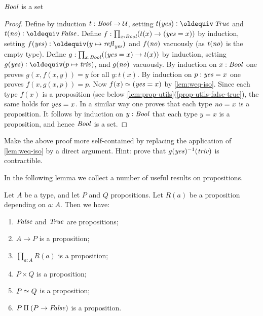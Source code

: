\begin{lemma}\label{lem:isset-bool}
$\mathop{\mathit{Bool}}$ is a set
\end{lemma}
\begin{proof}
Define by induction $t:\mathop{\mathit{Bool}}\to\mathcal{U}$, setting $t(\yes)\defeq \true$ and
$t(\no)\defeq \false$. Define $f:\prod_{x:\mathop{\mathit{Bool}}}(t(x)\to (\mathop{\mathit{yes}}=x))$ by
induction, setting $f(\yes)\defeq (y\mapsto \refl{\yes})$ and 
$f(\mathop{\mathit{no}})$ vacuously (as $t(\mathop{\mathit{no}})$ is the empty type). 
Define $g:\prod_{x:\mathop{\mathit{Bool}}}((\mathop{\mathit{yes}}=x)\to t(x))$ by induction, 
setting $g(\yes)\defeq (p\mapsto \triv)$, and $g(\mathop{\mathit{no}})$ vacuously. 
By induction on $x:\mathop{\mathit{Bool}}$ one proves $g(x,f(x,y))=y$ for all $y:t(x)$. 
By induction on $p: \mathop{\mathit{yes}} = x$ one proves $f(x,g(x,p))=p$.
Now $f(x)\simeq (\mathop{\mathit{yes}}=x)$ by \cref{lem:weq-iso}.  
Since each type $f(x)$ is a proposition (see below
\cref{lem:prop-utils}(\ref{prop-utils-false-true}), the same holds
for $\mathop{\mathit{yes}} = x$. In a similar way one proves that each
type $\mathop{\mathit{no}} = x$ is a proposition. It follows by induction on $y:\mathop{\mathit{Bool}}$
that each type $y = x$ is a proposition, and hence $\mathop{\mathit{Bool}}$ is a set.
\end{proof}

\begin{xca}\label{xca:isset-bool}
Make the above proof more self-contained by replacing
the application of \cref{lem:weq-iso} by a direct argument.
Hint: prove that $g(\mathop{\mathit{yes}})^{-1}(\mathop{\mathit{triv}})$ is contractible.
\end{xca}

In the following lemma we collect a number of useful results on propositions.

\begin{lemma}\label{lem:prop-utils}
Let $A$ be a type, and let $P$ and $Q$ propositions.
Let $R(a)$ be a proposition depending on $a:A$. Then we have:
\begin{enumerate}
\item\label{prop-utils-false-true} $\mathop{\mathit{False}}$ and $\mathop{\mathit{True}}$ are propositions;
\item\label{prop-utils-implication} $A\to P$ is a proposition;
\item\label{prop-utils-pi} $\prod_{a:A} R(a)$ is a proposition;
\item\label{prop-utils-times} $P\times Q$ is a proposition;
\item\label{prop-utils-eq} $P \simeq Q$ is a proposition;
\item\label{prop-utils-lem} $P \amalg (P\to\mathop{\mathit{False}})$ is a proposition.
\end{enumerate}
\end{lemma}

